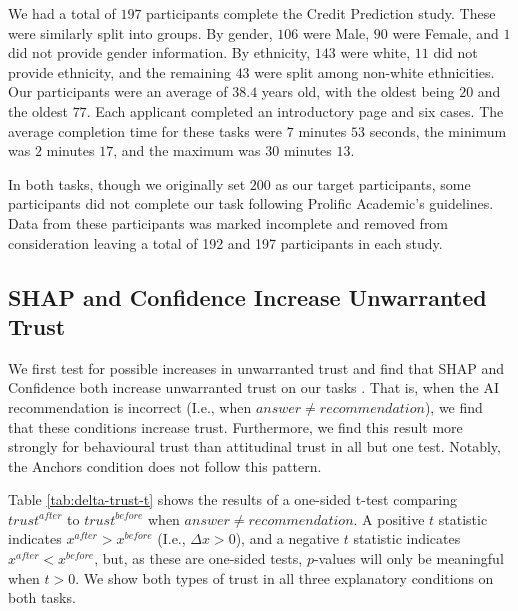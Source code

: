 We had a total of $197$ participants complete the Credit Prediction study. These were similarly split into groups. By gender, $106$ were Male, $90$ were Female, and $1$ did not provide gender information. By ethnicity, $143$ were white, $11$ did not provide ethnicity, and the remaining $43$ were split among non-white ethnicities. Our participants were an average of $38.4$ years old, with the oldest being $20$ and the oldest $77$. Each applicant completed an introductory page and six cases. The average completion time for these tasks were $7$ minutes $53$ seconds, the minimum was $2$ minutes $17$, and the maximum was $30$ minutes $13$.

In both tasks, though we originally set $200$ as our target participants, some participants did not complete our task following Prolific Academic's guidelines. Data from these participants was marked incomplete and removed from consideration leaving a total of 192 and 197 participants in each study.

\subsection{SHAP and Confidence Increase Unwarranted Trust}\label{ssec:ttests}
We first test for possible increases in unwarranted trust and find that SHAP and Confidence both increase unwarranted trust on our tasks \cite{natarajan_binns_2022}. That is, when the AI recommendation is incorrect (I.e., when $answer \neq recommendation$), we find that these conditions increase trust. Furthermore, we find this result more strongly for behavioural trust than attitudinal trust in all but one test. Notably, the Anchors condition does not follow this pattern.

Table \ref{tab:delta-trust-t} shows the results of a one-sided t-test comparing $trust^{after}$ to $trust^{before}$ when $answer \neq recommendation$. A positive $t$ statistic indicates $x^{after} > x^{before}$ (I.e., $\Delta x > 0$), and a negative $t$ statistic indicates $x^{after} < x^{before}$, but, as these are one-sided tests, $p$-values will only be meaningful when $t > 0$. We show both types of trust in all three explanatory conditions on both tasks.

